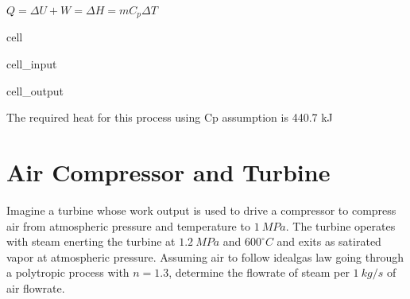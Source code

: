 \documentclass[letterpaper,10pt,english]{jupyterBook}
\begin{document}
\sphinxAtStartPar
\(Q=\Delta U + W=\Delta H=mC_p\Delta T\)

\begin{sphinxuseclass}{cell}\begin{sphinxVerbatimInput}

\begin{sphinxuseclass}{cell_input}
\begin{sphinxVerbatim}[commandchars=\\\{\}]
   
      
\end{sphinxVerbatim}

\end{sphinxuseclass}\end{sphinxVerbatimInput}
\begin{sphinxVerbatimOutput}

\begin{sphinxuseclass}{cell_output}
\begin{sphinxVerbatim}[commandchars=\\\{\}]
The required heat for this process using Cp assumption is 440.7 kJ
\end{sphinxVerbatim}

\end{sphinxuseclass}\end{sphinxVerbatimOutput}

\end{sphinxuseclass}
\sphinxstepscope


\section{Air Compressor and Turbine}
\label{\detokenize{notebooks/Chapter5/CH5-Q3:air-compressor-and-turbine}}\label{\detokenize{notebooks/Chapter5/CH5-Q3::doc}}
\sphinxAtStartPar
Imagine a turbine whose work output is used to drive a compressor to compress air from atmospheric pressure and temperature to \(1\:MPa\). The turbine operates with steam enerting the turbine at \(1.2\:MPa\) and \(600 ^{\circ}  C\) and exits as satirated vapor at atmospheric pressure. Assuming air to follow ideal\sphinxhyphen{}gas law going through a polytropic process with \(n=1.3\), determine the flow\sphinxhyphen{}rate of steam per \(1\:kg/s\) of air flow\sphinxhyphen{}rate.
\end{document}
